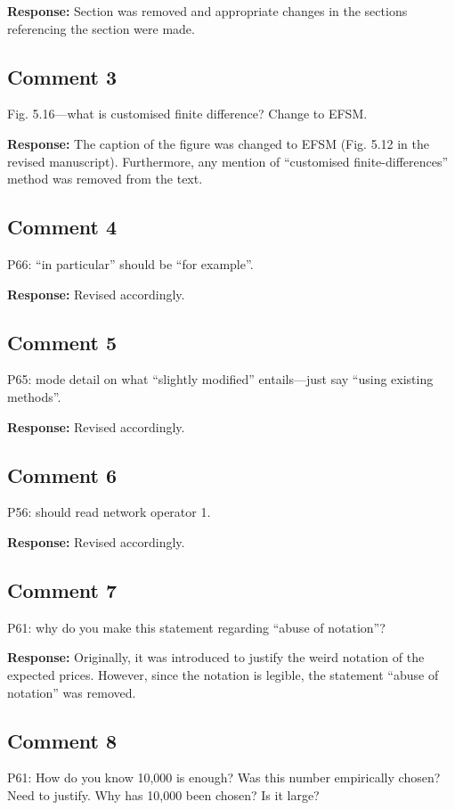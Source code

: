 \documentclass[10pt,a4paper,notitlepage]{article}
\numberwithin{equation}{section}
\begin{document}
\textbf{Response:}
Section was removed and appropriate changes in the sections referencing the section were made.

\subsection{Comment 3}
Fig. 5.16---what is customised finite difference? Change to EFSM.

\textbf{Response:}
The caption of the figure was changed to EFSM (Fig. 5.12 in the revised manuscript). Furthermore, any mention of ``customised finite-differences'' method was removed from the text.

\subsection{Comment 4}
P66: ``in particular'' should be ``for example''.

\textbf{Response:}
Revised accordingly.

\subsection{Comment 5}
P65: mode detail on what ``slightly modified'' entails---just say ``using existing methods''.

\textbf{Response:}
Revised accordingly.

\subsection{Comment 6}
P56: should read network operator 1.

\textbf{Response:}
Revised accordingly.

\subsection{Comment 7}
P61: why do you make this statement regarding ``abuse of notation''?

\textbf{Response:}
Originally, it was introduced to justify the weird notation of the expected prices. However, since the notation is legible, the statement ``abuse of notation'' was removed.

\subsection{Comment 8}
P61: How do you know 10,000 is enough? Was this number empirically chosen? Need to justify. Why has 10,000 been chosen? Is it large?
\end{document}
